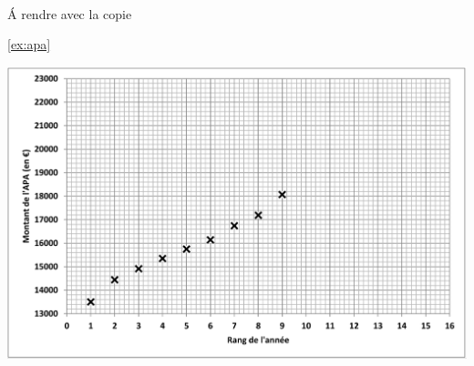 \documentclass[a4paper,12pt]{exam}
\author{\ }
\begin{document}
%	

	
	

\ 
\ 
\\

\newpage











\newpage

\appendix

\section{}\label{sec:nuage}


\begin{center}
	 {\Large \'A rendre avec la copie
	 
	 \ref{ex:apa}}
 
 	\vspace*{1cm}
	
	\includegraphics[scale=0.42]{img/graph}
\end{center}

\label{annexe}
	\label{LastPage}
	
\end{document}
